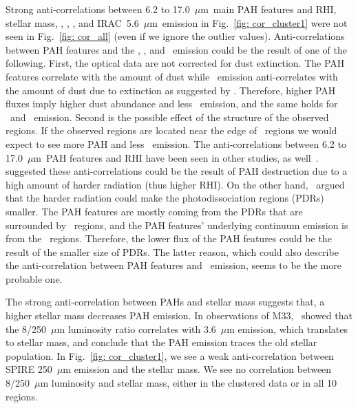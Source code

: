      
        Strong anti-correlations between 6.2 to 17.0~$\mu$m~main PAH features and RHI, stellar mass, \halpha, \sii, \oiii, and IRAC~5.6~$\mu$m~emission in Fig.~\ref{fig: cor_cluster1} were not seen in Fig.~\ref{fig: cor_all} (even if we ignore the outlier values).
        Anti-correlations between PAH features and the \halpha, \sii, and \oiii~emission could be the result of one of the following. 
        First, the optical data are not corrected for dust extinction.
        The PAH features correlate with the amount of dust while \halpha~emission anti-correlates with the amount of dust due to extinction as suggested by \cite{Calzetti94}.
        Therefore, higher PAH fluxes imply higher dust abundance and less \halpha~emission, and the same holds for \sii~and \oiii~emission.
        Second is the possible effect of the structure of the observed regions.
        If the observed regions are located near the edge of \hii~regions we would expect to see more PAH and less \halpha~emission. 
        The anti-correlations between 6.2 to 17.0~$\mu$m~PAH features and RHI have been seen in other studies, as well~\citep[e.g.][]{Wu06, Gordon08,Calzetti10,Dim15}. 
        \cite{Wu06} suggested these anti-correlations could be the result of PAH destruction due to a high amount of harder radiation (thus higher RHI).
        On the other hand,~\cite{Gordon08} argued that the harder radiation could make the photodissociation regions (PDRs) smaller.
        The PAH features are mostly coming from the PDRs that are surrounded by \hii~regions, and the PAH features' underlying continuum emission is from the \hii~regions.
        Therefore, the lower flux of the PAH features could be the result of the smaller size of PDRs.%
        The latter reason, which could also describe the anti-correlation between PAH features and \halpha~emission, seems to be the more probable one. 
        
        The strong anti-correlation between PAHs and stellar mass suggests that, a higher stellar mass decreases PAH emission. 
        In observations of M33,~\cite{Calapa14} showed that the 8/250~$\mu$m luminosity ratio correlates with 3.6~$\mu$m emission, which translates to stellar mass, %
        and conclude that the PAH emission traces the old stellar population.
        In Fig.~\ref{fig: cor_cluster1}, we see a weak anti-correlation between SPIRE 250~$\mu$m emission and the stellar mass.
        We see no correlation between 8/250~$\mu$m luminosity and stellar mass, either in the clustered data or in all 10 regions.


